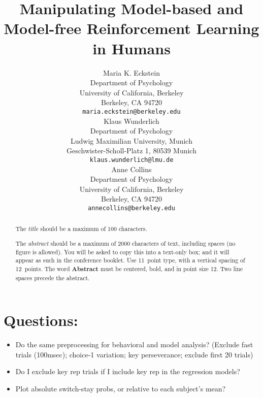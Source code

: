 \documentclass[11pt]{article} %
\title{Manipulating Model-based and Model-free Reinforcement Learning in Humans}
\author{
Maria K. Eckstein \\
Department of Psychology \\
University of California, Berkeley \\
Berkeley, CA 94720 \\
\texttt{maria.eckstein@berkeley.edu} \\
\And
Klaus Wunderlich \\
Department of Psychology \\
Ludwig Maximilian University, Munich \\
Geschwister-Scholl-Platz 1, 80539 Munich \\
\texttt{klaus.wunderlich@lmu.de} \\
\And
Anne Collins \\
Department of Psychology\\
University of California, Berkeley \\
Berkeley, CA 94720  \\
\texttt{annecollins@berkeley.edu} \\
}
\begin{document}
\maketitle

\begin{abstract}
The \emph{title} should be a maximum of 100 characters. 

The \emph{abstract} should be a maximum of 2000 characters of text,
including spaces (no figure is allowed). You will be asked to copy
this into a text-only box; and it will appear as such in the
conference booklet. Use 11~point type, with a vertical spacing of
12~points.  The word \textbf{Abstract} must be centered, bold, and in
point size 12. Two line spaces precede the abstract.
\end{abstract}




\startmain %

\section{Questions:}
\begin{itemize}
	\item Do the same preprocessing for behavioral and model analysis? (Exclude fast trials (100msec); choice-1 variation; key perseverance; exclude first 20 trials)
	\item Do I exclude key rep trials if I include key rep in the regression models?
	\item Plot absolute switch-stay probs, or relative to each subject's mean?
\end{itemize}
\end{document}
